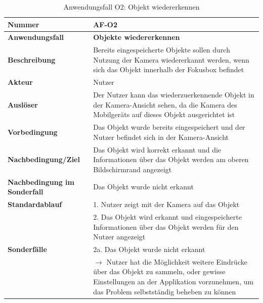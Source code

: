 \documentclass[oneside]{ausarbeitung}
\begin{document}
\begin{table}[htbp]
	\centering
	\begin{tabular}{|l|p{80mm}|}
		\hline
		\textbf{Nummer} & \textbf{AF-O2} \\ \hline
		\textbf{Anwendungsfall} & \textbf{Objekte wiedererkennen} \\ \hline
		\textbf{Beschreibung} & Bereits eingespeicherte Objekte sollen durch Nutzung der Kamera wiedererkannt werden, wenn sich das Objekt innerhalb der Fokusbox befindet \\ \hline
		\textbf{Akteur} & Nutzer \\ \hline
		\textbf{Auslöser} & Der Nutzer kann das wiederzuerkennende Objekt in der Kamera-Ansicht sehen, da die Kamera des Mobilgeräts auf dieses Objekt ausgerichtet ist  \\ \hline
		\textbf{Vorbedingung} & Das Objekt wurde bereits eingespeichert und der Nutzer befindet sich in der Kamera-Ansicht \\ \hline	
		\textbf{Nachbedingung/Ziel} & Das Objekt wird korrekt erkannt und die Informationen über das Objekt werden am oberen Bildschirmrand angezeigt \\ \hline
		\textbf{Nachbedingung im Sonderfall} & Das Objekt wurde nicht erkannt \\ \hline
		\textbf{Standardablauf} & 1. Nutzer zeigt mit der Kamera auf das Objekt \\ 
		& 2. Das Objekt wird erkannt und eingespeicherte Informationen über das Objekt werden für den Nutzer angezeigt\\ \hline
		\textbf{Sonderfälle} & 2a. Das Objekt wurde nicht erkannt \\ & $\rightarrow$ Nutzer hat die Möglichkeit weitere Eindrücke über das Objekt zu sammeln, oder gewisse Einstellungen an der Applikation vorzunehmen, um das Problem selbstständig beheben zu können\\ \hline
		
	\end{tabular}
	\caption{Anwendungsfall O2: Objekt wiedererkennen}
	\label{tab:use-case-recognize-objects}
\end{table}
\end{document}
